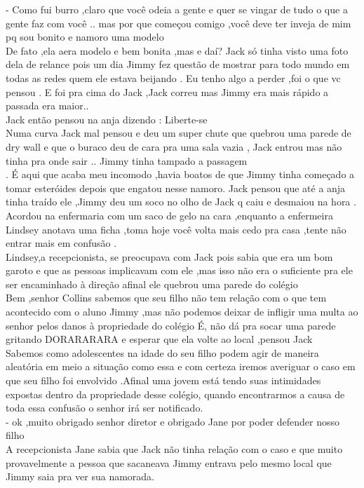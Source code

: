 \documentclass{book}
\begin{document}
- Como fui burro ,claro que você odeia a gente e quer se vingar de tudo o que a gente faz com você .. mas por que começou comigo ,você deve ter inveja de mim pq sou bonito e namoro uma modelo\\
De fato ,ela aera modelo e bem bonita ,mas e daí? Jack só tinha visto uma foto dela de relance pois um dia Jimmy fez questão de mostrar para todo mundo em todas as redes quem ele estava beijando .
Eu tenho algo a perder ,foi o que vc pensou . E foi pra cima do Jack ,Jack correu mas Jimmy era mais rápido a passada era maior..\\
Jack então pensou na anja dizendo : Liberte-se \\
Numa curva Jack mal pensou e deu um super chute que quebrou uma parede de dry wall e que o buraco deu de cara pra uma sala vazia , Jack entrou mas não tinha pra onde sair .. Jimmy tinha tampado a passagem \\
. É aqui que acaba meu incomodo ,havia boatos de que Jimmy tinha começado a tomar esteróides depois que engatou nesse namoro.
Jack pensou que até a anja tinha traído ele ,Jimmy deu um soco no olho de Jack q caiu e desmaiou na hora .\\
Acordou na enfermaria com um saco de gelo na cara ,enquanto a enfermeira Lindsey anotava uma ficha ,toma hoje você volta mais cedo pra casa ,tente não entrar mais em confusão .\\
Lindsey,a recepcionista, se preocupava com Jack pois sabia que era um bom garoto e que as pessoas implicavam com ele ,mas isso não era o suficiente pra ele ser encaminhado à direção  afinal ele quebrou uma parede do colégio \\
Bem ,senhor Collins sabemos que seu filho não tem relação com o que tem acontecido com o aluno Jimmy ,mas não podemos deixar de infligir uma multa ao senhor pelos danos à propriedade do colégio 
É, não dá pra socar uma parede gritando DORARARARA e esperar que ela volte ao local ,pensou Jack\\
Sabemos como adolescentes na idade do seu filho podem agir de maneira aleatória em meio a situação como essa e com certeza iremos averiguar o caso em que seu filho foi envolvido .Afinal uma jovem está tendo suas intimidades expostas dentro da propriedade desse colégio, quando encontrarmos a causa de toda essa confusão o senhor irá ser notificado.\\
- ok ,muito obrigado senhor diretor e obrigado Jane por poder defender nosso filho \\
A recepcionista Jane sabia que Jack não tinha relação com o caso e que muito provavelmente a pessoa que sacaneava Jimmy entrava pelo mesmo local que Jimmy saia pra ver sua namorada.\\
\end{document}
